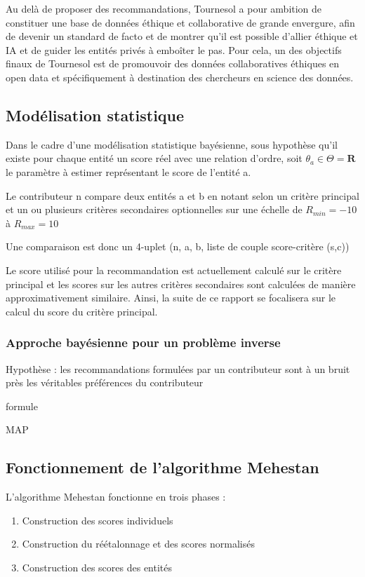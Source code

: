 Au delà de proposer des recommandations, Tournesol a pour ambition de constituer une base de données éthique et collaborative de grande envergure, afin de devenir un standard de facto et de montrer qu'il est possible d'allier éthique et IA et de guider les entités privés à emboîter le pas. Pour cela, un des objectifs finaux de Tournesol est de promouvoir des données collaboratives éthiques en open data et spécifiquement à destination des chercheurs en science des données.

\subsection{Modélisation statistique}

Dans le cadre d'une modélisation statistique bayésienne, sous hypothèse qu'il existe pour chaque entité un score réel avec une relation d'ordre, soit $\theta_{a}\in\Theta=\mathbf{R}$ le paramètre à estimer représentant le score de l'entité a.

Le contributeur n compare deux entités a et b en notant selon un critère principal et un ou plusieurs critères secondaires optionnelles sur une échelle de $R_{min}=-10$ à $R_{max}=10$

Une comparaison est donc un 4-uplet (n, a, b, liste de couple score-critère (s,c))

Le score utilisé pour la recommandation est actuellement calculé sur le critère principal et les scores sur les autres critères secondaires sont calculées de manière approximativement similaire. Ainsi, la suite de ce rapport se focalisera sur le calcul du score du critère principal.

\subsubsection{Approche bayésienne pour un problème inverse}
Hypothèse : les recommandations formulées par un contributeur sont à un bruit près les véritables préférences du contributeur


formule

MAP

\subsection{Fonctionnement de l'algorithme Mehestan}

L'algorithme Mehestan fonctionne en trois phases :

\begin{enumerate}
    \item Construction des scores individuels
    \item Construction du réétalonnage et des scores normalisés
    \item Construction des scores des entités
\end{enumerate}
